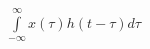 \documentclass[preview]{standalone}
\begin{document}
\begin{center}
{\small $\int\limits_{-\infty}^{\infty}x(\tau)h(t-\tau)d\tau$}
\end{center}
\end{document}

